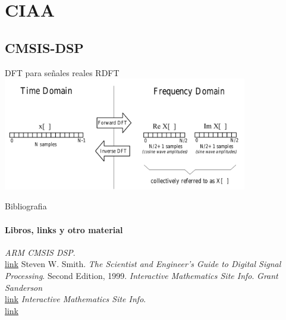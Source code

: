  \section{CIAA}
 \subsection{CMSIS-DSP}
 \begin{frame}{}{DFT para señales reales RDFT}
    \handsonicon
    \center\includegraphics[width=0.8\textwidth]{3_clase/real_dft_idft}
    \vfill
 \end{frame}
\begin{frame}{Bibliografia}
   \framesubtitle{Libros, links y otro material}
   \begin{thebibliography}{9}
         \emph{ARM CMSIS DSP}. \\
         \href {https://arm-software.github.io/CMSIS_5/DSP/html/index.html}{link}
         Steven W. Smith.
         \emph{The Scientist and Engineer's Guide to Digital Signal Processing}.
         Second Edition, 1999.
         \emph{Interactive Mathematics Site Info}.
         \emph{Grant Sanderson} \\
         \href{ https://youtu.be/spUNpyF58BY}{link}
            \emph{Interactive Mathematics Site Info}. \\
            \href {https://www.intmath.com/fourier-series/fourier-intro.php}{link}
   \end{thebibliography}
\end{frame}

